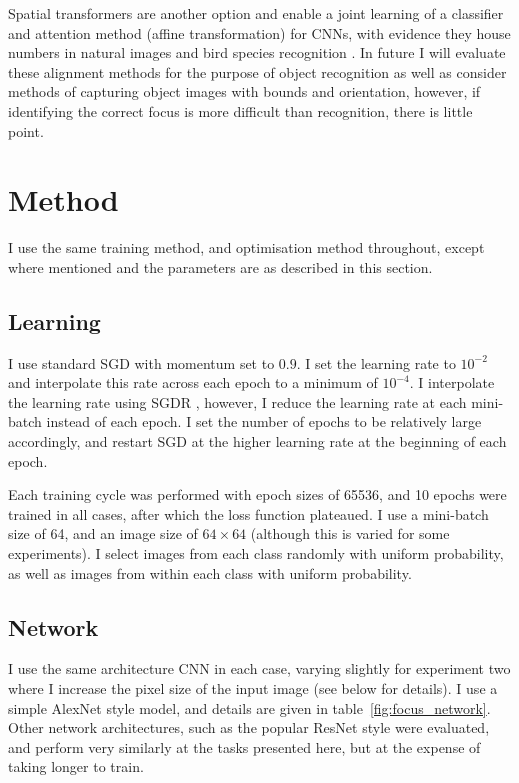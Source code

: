 Spatial transformers \cite{Jaderberg2015} are another option and enable a joint learning of a classifier and attention method (affine transformation) for \gls{CNN}s, with evidence they  house numbers in natural images \cite{Netzer2011} and bird species recognition \cite{Wah2011}. In future I will evaluate these alignment methods for the purpose of object recognition as well as consider methods of capturing object images with bounds and orientation, however, if identifying the correct focus is more difficult than recognition, there is little point.


\section{Method}

I use the same training method, and optimisation method throughout, except where mentioned and the parameters are as described in this section. 

\subsection {Learning}

I use standard \gls{SGD} with momentum set to $ 0.9 $. I set the learning rate to $ 10^{-2} $ and interpolate this rate across each epoch to a minimum of $ 10^{-4} $. I interpolate the learning rate using \gls{SGDR}  \cite{Loshchilov2016}, however, I reduce the learning rate at each mini-batch instead of each epoch. I set the number of epochs to be relatively large accordingly, and restart SGD at the higher learning rate at the beginning of each epoch. 

Each training cycle was performed with epoch sizes of 65536, and 10 epochs were trained in all cases, after which the loss function plateaued. I use a mini-batch size of 64, and an image size of $64\times64$ (although this is varied for some experiments). I select images from each class randomly with uniform probability, as well as images from within each class with uniform probability.

\subsection {Network}

I use the same architecture CNN in each case, varying slightly for experiment two where I increase the pixel size of the input image (see below for details). I use a simple AlexNet \cite {Krizhevsky2012} style model, and details are given in table~\ref{fig:focus_network}. Other network architectures, such as the popular ResNet \cite{He2015} style were evaluated, and perform very similarly at the tasks presented here, but at the expense of taking longer to train.

